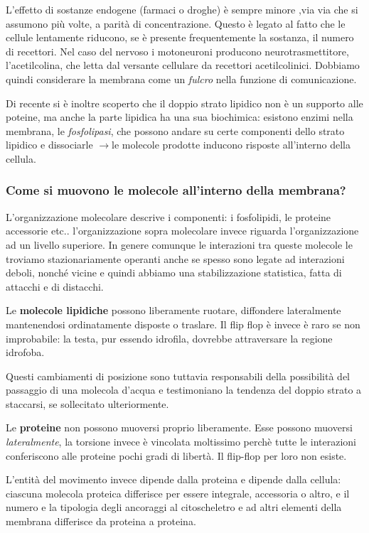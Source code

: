 \documentclass[a4paper,12pt]{article}
\newcommand{\lfreccia}{\ensuremath{\longrightarrow}}
\begin{document}
L'effetto di sostanze endogene (farmaci o droghe) è sempre minore ,via via che si assumono più volte, a parità di concentrazione. Questo è legato al fatto che le cellule lentamente riducono, se è presente frequentemente la sostanza, il numero di recettori.
Nel caso del nervoso i motoneuroni producono neurotrasmettitore, l'acetilcolina, che letta dal versante cellulare da recettori acetilcolinici.
Dobbiamo quindi considerare la membrana come un \emph{fulcro} nella funzione di comunicazione.

Di recente si è inoltre scoperto che il doppio strato lipidico non è un supporto alle poteine, ma anche la parte lipidica ha una sua biochimica: esistono enzimi nella membrana, le \emph{fosfolipasi}, che possono andare su certe componenti dello strato lipidico e dissociarle \lfreccia le molecole prodotte inducono risposte all'interno della cellula.

\subsubsection{Come si muovono le molecole all'interno della membrana?}
L'organizzazione molecolare descrive i componenti: i fosfolipidi, le proteine accessorie etc..
l'organizzazione sopra molecolare invece riguarda l'organizzazione ad un livello superiore.
In genere comunque le interazioni tra queste molecole le troviamo stazionariamente operanti anche se spesso sono legate ad interazioni deboli, nonché vicine e quindi abbiamo una stabilizzazione statistica, fatta di attacchi e di distacchi.

Le \textbf{molecole lipidiche} possono liberamente ruotare, diffondere lateralmente mantenendosi ordinatamente disposte o traslare. Il flip flop è invece è raro se non improbabile: la testa, pur essendo idrofila, dovrebbe attraversare la regione idrofoba. 

Questi cambiamenti di posizione sono tuttavia responsabili della possibilità del passaggio di una molecola d'acqua e testimoniano la tendenza del doppio strato a staccarsi, se sollecitato ulteriormente.


Le \textbf{proteine} non possono muoversi proprio liberamente. Esse possono muoversi \emph{lateralmente}, la torsione invece è vincolata moltissimo perchè tutte le interazioni conferiscono alle proteine pochi gradi di libertà. Il flip-flop per loro non esiste.

L'entità del movimento invece dipende dalla proteina e dipende dalla cellula: ciascuna molecola proteica differisce per essere integrale, accessoria o altro, e il numero e la tipologia degli ancoraggi al citoscheletro e ad altri elementi della membrana differisce da proteina a proteina. 
\end{document}
